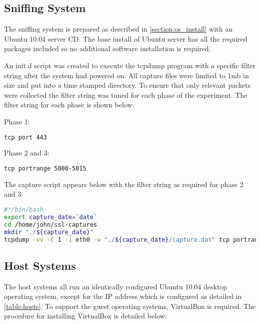 \subsection{Sniffing System}

The sniffing system is prepared as described in \ref{section:os_install} with an
Ubuntu 10.04 server CD. The base install of Ubuntu server has all the required
packages included so no additional software installation is required.

An init.d script was created to execute the tcpdump program with a specific
filter string after the system had powered on. All capture files were limited to
1mb in size and put into a time stamped directory. To ensure that only relevant
packets were collected the filter string was tuned for each phase of the
experiment. The filter string for each phase is shown below.

Phase 1:
\begin{lstlisting}[language=sh]
tcp port 443
\end{lstlisting}

Phase 2 and 3:
\begin{lstlisting}[language=sh]
tcp portrange 5000-5015
\end{lstlisting}

The capture script appears below with the filter string as required for phase 2
and 3:

\begin{lstlisting}[language=sh]
#!/bin/bash
export capture_date=`date`
cd /home/john/ssl-captures
mkdir "./${capture_date}"
tcpdump -vv -C 1 -i eth0 -w "./${capture_date}/capture.dat" tcp portrange 5001-5015
\end{lstlisting}

\subsection{Host Systems}

The host systems all run an identically configured Ubuntu 10.04 desktop
operating system, except for the IP address which is configured as detailed in
\ref{table:hosts}. To support the guest operating systems, VirtualBox is
required. The procedure for installing VirtualBox is detailed below:

